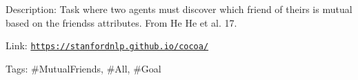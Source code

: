 Description\+: Task where two agents must discover which friend of theirs is mutual based on the friends\textquotesingle{}s attributes. From He He et al. \textquotesingle{}17.

Link\+: \href{https://stanfordnlp.github.io/cocoa/}{\tt https\+://stanfordnlp.\+github.\+io/cocoa/}

Tags\+: \#\+Mutual\+Friends, \#\+All, \#\+Goal 